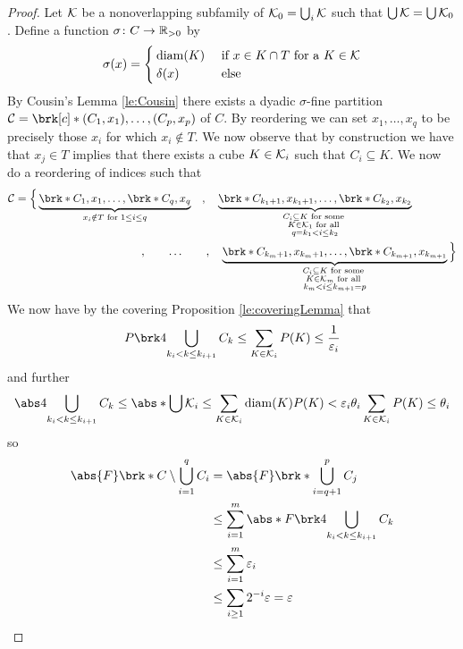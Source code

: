 \begin{proof}
Let $\mathcal{K}$ be a nonoverlapping subfamily of $\mathcal{K}_0=\bigcup_i\mathcal{K}$ such that $\bigcup\mathcal{K}=\bigcup\mathcal{K}_0$. Define a function $\sigma\colon C\to \mathbb{R}_{>0}$ by
\begin{align*}
	\sigma(x)=\begin{cases}
		\operatorname{diam}(K)&\text{ if }x\in K\cap T\text{ for a }K\in\mathcal{K}\\
		\delta(x) &\text{ else}
	\end{cases}
\end{align*}
By Cousin's Lemma \ref{le:Cousin} there exists a dyadic $\sigma$-fine partition $\cC=\brk[c]*{(C_1,x_1),\dots,(C_p,x_p)}$ of $C$.
By reordering we can set $x_1,\dots,x_q$ to be precisely those $x_i$ for which $x_i\notin T$. We now observe that by construction we have that $x_j\in T$ implies that there exists a cube $K\in\mathcal{K}_i$ such that $C_i\subseteq K$. We now do a reordering of indices such that
\begin{align*}
	\cC=\Big\{\underbrace{\brk*{C_1,x_1},\dots,\brk*{C_q,x_q}}_{x_i\notin T\text{ for }1\leq i\leq q}\quad,\quad \underbrace{\brk*{C_{k_1+1},x_{k_1+1}},\dots,\brk*{C_{k_2},x_{k_2}}}_{\substack{C_i\subseteq K\text{ for some } \\ K\in\cK_1\text{ for all } \\ q=k_1< i\leq k_2}}\qquad\qquad&\\
	\qquad\qquad,\qquad\dots\qquad,\quad \underbrace{\brk*{C_{k_m+1},x_{k_m+1}},\dots,\brk*{C_{k_{m+1}},x_{k_{m+1}}}}_{\substack{C_i\subseteq K\text{ for some } \\ K\in\cK_{m}\text{ for all } \\ k_m< i\leq k_{m+1}=p}}\Big\}&
\end{align*}
We now have by the covering Proposition \ref{le:coveringLemma} that
\begin{align*}
	P\brk4{\bigcup_{k_i<k\leq k_{i+1}}C_k}
	\leq \sum_{K\in\cK_i}P(K)
	\leq \frac{1}{\e_i}
\end{align*}
and further
\begin{align*}
	\abs4{\bigcup_{k_i<k\leq k_{i+1}}C_k}
	\leq \abs*{\bigcup\cK_i}
	\leq \sum_{K\in\cK_i}\diam(K)P(K)
	<\e_i\theta_i\sum_{K\in\cK_i}P(K)\leq \theta_i
\end{align*}
so
\begin{align*}
	\abs{F}\brk*{C\setminus\bigcup_{i=1}^q C_i}
	&=\abs{F}\brk*{\bigcup_{i=q+1}^p C_j} \\
	&\leq \sum_{i=1}^m\abs*{F}\brk4{\bigcup_{k_i<k\leq k_{i+1}}C_k} \\
	&\leq \sum_{i=1}^m\e_i \\
	&\leq \sum_{i\geq 1}2^{-i}\e=\e
\end{align*}
\end{proof}

